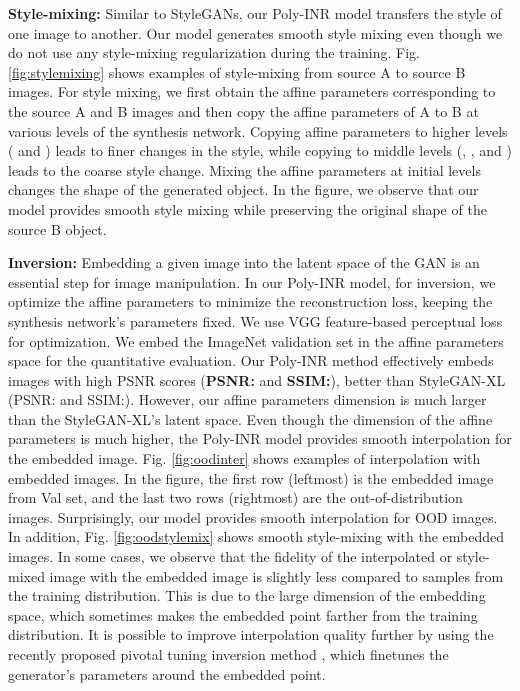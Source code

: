\noindent\textbf{Style-mixing:} Similar to StyleGANs, our Poly-INR model transfers the style of one image to another. Our model generates smooth style mixing even though we do not use any style-mixing regularization during the training. Fig. \ref{fig:stylemixing} shows examples of style-mixing from source A to source B images. For style mixing, we first obtain the affine parameters corresponding to the source A and B images and then copy the affine parameters of A to B at various levels of the synthesis network. Copying affine parameters to higher levels ( and ) leads to finer changes in the style, while copying to middle levels (, , and  ) leads to the coarse style change. Mixing the affine parameters at initial levels changes the shape of the generated object. In the figure, we observe that our model provides smooth style mixing while preserving the original shape of the source B object.







\noindent\textbf{Inversion:}
Embedding a given image into the latent space of the GAN is an essential step for image manipulation. In our Poly-INR model, for inversion, we optimize the affine parameters to minimize the reconstruction loss, keeping the synthesis network's parameters fixed. We use VGG feature-based perceptual loss for optimization. We embed the ImageNet validation set in the affine parameters space for the quantitative evaluation. Our Poly-INR method effectively embeds images with high PSNR scores (\textbf{PSNR:} and \textbf{SSIM:}), better than StyleGAN-XL (PSNR: and SSIM:). However, our affine parameters dimension is much larger than the StyleGAN-XL's latent space. Even though the dimension of the affine parameters is much higher, the Poly-INR model provides smooth interpolation for the embedded image. Fig. \ref{fig:oodinter} shows examples of interpolation with embedded images. In the figure, the first row (leftmost) is the embedded image from Val set, and the last two rows (rightmost) are the out-of-distribution images. Surprisingly, our model provides smooth interpolation for OOD images. In addition, Fig. \ref{fig:oodstylemix} shows smooth style-mixing with the embedded images. In some cases, we observe that the fidelity of the interpolated or style-mixed image with the embedded image is slightly less compared to samples from the training distribution. This is due to the large dimension of the embedding space, which sometimes makes the embedded point farther from the training distribution. It is possible to improve interpolation quality further by using the recently proposed pivotal tuning inversion method \cite{roich2022pivotal}, which finetunes the generator's parameters around the embedded point.


